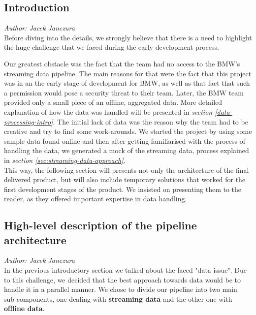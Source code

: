 

\subsection{Introduction}
\label{data-management-intro}
\textit{Author: Jacek Janczura}\\
Before diving into the details, we strongly believe that there is a need to  highlight the huge challenge that we faced during the early development process. 

Our greatest obstacle was the fact that the team had no access to the BMW's streaming data pipeline. The main reasons for that were the fact that this project was in an the early stage of development for BMW, as well as that fact that such a permission would pose a security threat to their team. Later, the BMW team provided only a small piece of an offline, aggregated data. More detailed explanation of how the data was handled will be presented in \textit{section \ref{data-processing-intro}}. The initial lack of data was the reason why the team had to be creative and try to find some work-arounds. We started the project by using some sample data found online and then after getting familiarised with the process of handling the data, we generated a mock of the streaming data, process explained in \textit{section \ref{sec:streaming-data-approach}}.\\
This way, the following section will presents not only the architecture of the final delivered product, but will also include temporary solutions that worked for the first development stages of the product. We insisted on presenting them to the reader, as they offered important expertise in data handling.

\subsection{High-level description of the pipeline architecture}
\label{sec:architecture_description}
\textit{Author: Jacek Janczura} \\
In the previous introductory section we talked about the faced "data issue". Due to this challenge, we decided that the best approach towards data would be to handle it in a parallel manner. We chose to divide our pipeline into two main sub-components, one dealing with \textbf{streaming data} and the other one with \textbf{offline data}.

